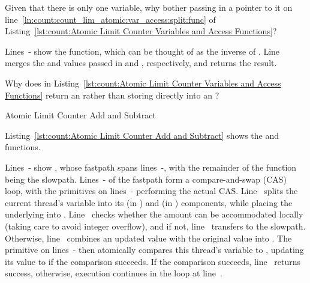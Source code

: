 \QuickQuiz{}
	Given that there is only one  variable,
	why bother passing in a pointer to it on
        line~\ref{ln:count:count_lim_atomic:var_access:split:func} of
	Listing~\ref{lst:count:Atomic Limit Counter Variables and Access Functions}?
 \QuickQuizEnd

\begin{lineref}
Lines~- show the  function, which
can be thought of as the inverse of .
Line~ merges the  and 
values passed in  and , respectively, and returns
the result.
\end{lineref}

\QuickQuiz{}
	Why does  in
	Listing~\ref{lst:count:Atomic Limit Counter Variables and Access Functions}
	return an  rather than storing directly into an
	?
 \QuickQuizEnd

\begin{listing}[tbp]

\caption{Atomic Limit Counter Add and Subtract}
\label{lst:count:Atomic Limit Counter Add and Subtract}
\end{listing}

Listing~\ref{lst:count:Atomic Limit Counter Add and Subtract}
shows the  and  functions.

\begin{lineref}
Lines~- show , whose fastpath spans
lines~-,
with the remainder of the function being the slowpath.
Lines~- of the fastpath form a compare-and-swap
(CAS) loop, with
the  primitives on
lines~- performing the
actual CAS.
Line~ splits the current thread's  variable into its
 (in ) and  (in ) components,
while placing the underlying  into .
Line~ checks whether the amount  can be accommodated
locally (taking care to avoid integer overflow), and if not,
line~ transfers to the slowpath.
Otherwise, line~ combines an updated  value with the
original  value into .
The  primitive on
lines~- then atomically
compares this thread's  variable to ,
updating its value to  if the comparison succeeds.
If the comparison succeeds, line~ returns success, otherwise,
execution continues in the loop at line~.
\end{lineref}

